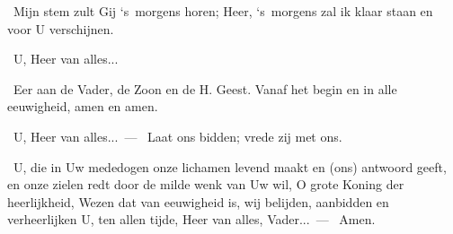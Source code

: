 \documentclass[12pt,twoside,a5paper]{article}
\begin{document}
\begin{halfparskip}
  \dd~Mijn stem zult Gij `s~morgens horen; Heer, `s~morgens zal ik klaar staan en voor U verschijnen.

  \rr~U, Heer van alles...

  \dd~Eer aan de Vader, de Zoon en de H. Geest. Vanaf het begin en in alle eeuwigheid, amen en amen.

  \rr~U, Heer van alles...~--- \dd~Laat ons bidden; vrede zij met ons.

  \cc~U, die in Uw mededogen onze lichamen levend maakt en (ons) antwoord geeft, en onze zielen redt door de milde wenk van Uw wil, O grote Koning der heerlijkheid, Wezen dat van eeuwigheid is, wij belijden, aanbidden en verheerlijken U, ten allen tijde, Heer van alles, Vader...~--- \rr~Amen.
\end{halfparskip}
\end{document}
